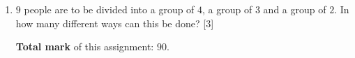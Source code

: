 \documentclass[a4paper]{article}
\begin{document}
\begin{enumerate}
\begin{enumerate}[resume,label=(\roman*)]
		
		\quad \hfill	[5]
		 
		\vspace{2cm}
	\end{enumerate}
	
	
	
	
	\item  $9$ people are to be divided into a group of $4$, a group of $3$ and a group of $2$. In how many different ways can this be done? \hfill[3]
	
	\vspace{3cm}
	
		\vfill
	\textbf{Total mark} of this assignment: $90$.\\
	



\end{enumerate}
\end{document}
